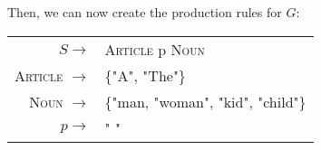 Then, we can now create the production rules for $G$:

\begin{center}
    \begin{tabular}{rl}
         $S \to$                & \textsc{Article} p \textsc{Noun} \\
         \textsc{Article} $\to$ & \{"A", "The"\} \\
         \textsc{Noun}    $\to$ & \{"man, "woman", "kid", "child"\}\\
         $p \to$                & " " 
    \end{tabular}
\end{center}
